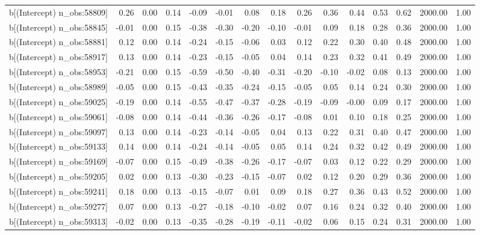 \begin{table}[ht]
\begin{tabular}{rrrrrrrrrrrrrrr}
  b[(Intercept) n\_obs:58809] & 0.26 & 0.00 & 0.14 & -0.09 & -0.01 & 0.08 & 0.18 & 0.26 & 0.36 & 0.44 & 0.53 & 0.62 & 2000.00 & 1.00 \\ 
  b[(Intercept) n\_obs:58845] & -0.01 & 0.00 & 0.15 & -0.38 & -0.30 & -0.20 & -0.10 & -0.01 & 0.09 & 0.18 & 0.28 & 0.36 & 2000.00 & 1.00 \\ 
  b[(Intercept) n\_obs:58881] & 0.12 & 0.00 & 0.14 & -0.24 & -0.15 & -0.06 & 0.03 & 0.12 & 0.22 & 0.30 & 0.40 & 0.48 & 2000.00 & 1.00 \\ 
  b[(Intercept) n\_obs:58917] & 0.13 & 0.00 & 0.14 & -0.23 & -0.15 & -0.05 & 0.04 & 0.14 & 0.23 & 0.32 & 0.41 & 0.49 & 2000.00 & 1.00 \\ 
  b[(Intercept) n\_obs:58953] & -0.21 & 0.00 & 0.15 & -0.59 & -0.50 & -0.40 & -0.31 & -0.20 & -0.10 & -0.02 & 0.08 & 0.13 & 2000.00 & 1.00 \\ 
  b[(Intercept) n\_obs:58989] & -0.05 & 0.00 & 0.15 & -0.43 & -0.35 & -0.24 & -0.15 & -0.05 & 0.05 & 0.14 & 0.24 & 0.30 & 2000.00 & 1.00 \\ 
  b[(Intercept) n\_obs:59025] & -0.19 & 0.00 & 0.14 & -0.55 & -0.47 & -0.37 & -0.28 & -0.19 & -0.09 & -0.00 & 0.09 & 0.17 & 2000.00 & 1.00 \\ 
  b[(Intercept) n\_obs:59061] & -0.08 & 0.00 & 0.14 & -0.44 & -0.36 & -0.26 & -0.17 & -0.08 & 0.01 & 0.10 & 0.18 & 0.25 & 2000.00 & 1.00 \\ 
  b[(Intercept) n\_obs:59097] & 0.13 & 0.00 & 0.14 & -0.23 & -0.14 & -0.05 & 0.04 & 0.13 & 0.22 & 0.31 & 0.40 & 0.47 & 2000.00 & 1.00 \\ 
  b[(Intercept) n\_obs:59133] & 0.14 & 0.00 & 0.14 & -0.24 & -0.14 & -0.05 & 0.05 & 0.14 & 0.24 & 0.32 & 0.42 & 0.49 & 2000.00 & 1.00 \\ 
  b[(Intercept) n\_obs:59169] & -0.07 & 0.00 & 0.15 & -0.49 & -0.38 & -0.26 & -0.17 & -0.07 & 0.03 & 0.12 & 0.22 & 0.29 & 2000.00 & 1.00 \\ 
  b[(Intercept) n\_obs:59205] & 0.02 & 0.00 & 0.13 & -0.30 & -0.23 & -0.15 & -0.07 & 0.02 & 0.12 & 0.20 & 0.29 & 0.36 & 2000.00 & 1.00 \\ 
  b[(Intercept) n\_obs:59241] & 0.18 & 0.00 & 0.13 & -0.15 & -0.07 & 0.01 & 0.09 & 0.18 & 0.27 & 0.36 & 0.43 & 0.52 & 2000.00 & 1.00 \\ 
  b[(Intercept) n\_obs:59277] & 0.07 & 0.00 & 0.13 & -0.27 & -0.18 & -0.10 & -0.02 & 0.07 & 0.16 & 0.24 & 0.32 & 0.40 & 2000.00 & 1.00 \\ 
  b[(Intercept) n\_obs:59313] & -0.02 & 0.00 & 0.13 & -0.35 & -0.28 & -0.19 & -0.11 & -0.02 & 0.06 & 0.15 & 0.24 & 0.31 & 2000.00 & 1.00 \\ 

\end{tabular}
\end{table}
